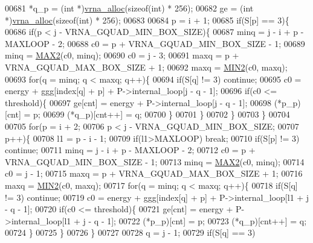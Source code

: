 \begin{DoxyCode}
00681   *q\_p  = (\textcolor{keywordtype}{int} *)\hyperlink{group__utils_gaf37a0979367c977edfb9da6614eebe99}{vrna\_alloc}(\textcolor{keyword}{sizeof}(\textcolor{keywordtype}{int}) * 256);
00682   ge    = (\textcolor{keywordtype}{int} *)\hyperlink{group__utils_gaf37a0979367c977edfb9da6614eebe99}{vrna\_alloc}(\textcolor{keyword}{sizeof}(\textcolor{keywordtype}{int}) * 256);
00683 
00684   p = i + 1;
00685   \textcolor{keywordflow}{if}(S[p] == 3)\{
00686     \textcolor{keywordflow}{if}(p < j - VRNA\_GQUAD\_MIN\_BOX\_SIZE)\{
00687       minq  = j - i + p - MAXLOOP - 2;
00688       c0    = p + VRNA\_GQUAD\_MIN\_BOX\_SIZE - 1;
00689       minq  = \hyperlink{group__utils_gadd91367918fadbc8d585940d6206d6d2}{MAX2}(c0, minq);
00690       c0    = j - 3;
00691       maxq  = p + VRNA\_GQUAD\_MAX\_BOX\_SIZE + 1;
00692       maxq  = \hyperlink{group__utils_ga2dd4a927a7f937f43a90c144d79107d8}{MIN2}(c0, maxq);
00693       \textcolor{keywordflow}{for}(q = minq; q < maxq; q++)\{
00694         \textcolor{keywordflow}{if}(S[q] != 3) \textcolor{keywordflow}{continue};
00695         c0  = energy + ggg[index[q] + p] + P->internal\_loop[j - q - 1];
00696         \textcolor{keywordflow}{if}(c0 <= threshold)\{
00697           ge[cnt]       = energy + P->internal\_loop[j - q - 1];
00698           (*p\_p)[cnt]   = p;
00699           (*q\_p)[cnt++] = q;
00700         \}
00701       \}
00702     \}
00703   \}
00704 
00705   \textcolor{keywordflow}{for}(p = i + 2;
00706       p < j - VRNA\_GQUAD\_MIN\_BOX\_SIZE;
00707       p++)\{
00708     l1    = p - i - 1;
00709     \textcolor{keywordflow}{if}(l1>MAXLOOP) \textcolor{keywordflow}{break};
00710     \textcolor{keywordflow}{if}(S[p] != 3) \textcolor{keywordflow}{continue};
00711     minq  = j - i + p - MAXLOOP - 2;
00712     c0    = p + VRNA\_GQUAD\_MIN\_BOX\_SIZE - 1;
00713     minq  = \hyperlink{group__utils_gadd91367918fadbc8d585940d6206d6d2}{MAX2}(c0, minq);
00714     c0    = j - 1;
00715     maxq  = p + VRNA\_GQUAD\_MAX\_BOX\_SIZE + 1;
00716     maxq  = \hyperlink{group__utils_ga2dd4a927a7f937f43a90c144d79107d8}{MIN2}(c0, maxq);
00717     \textcolor{keywordflow}{for}(q = minq; q < maxq; q++)\{
00718       \textcolor{keywordflow}{if}(S[q] != 3) \textcolor{keywordflow}{continue};
00719       c0  = energy + ggg[index[q] + p] + P->internal\_loop[l1 + j - q - 1];
00720         \textcolor{keywordflow}{if}(c0 <= threshold)\{
00721           ge[cnt]       = energy + P->internal\_loop[l1 + j - q - 1];
00722           (*p\_p)[cnt]   = p;
00723           (*q\_p)[cnt++] = q;
00724         \}
00725     \}
00726   \}
00727 
00728   q = j - 1;
00729   \textcolor{keywordflow}{if}(S[q] == 3)

\end{DoxyCode}

